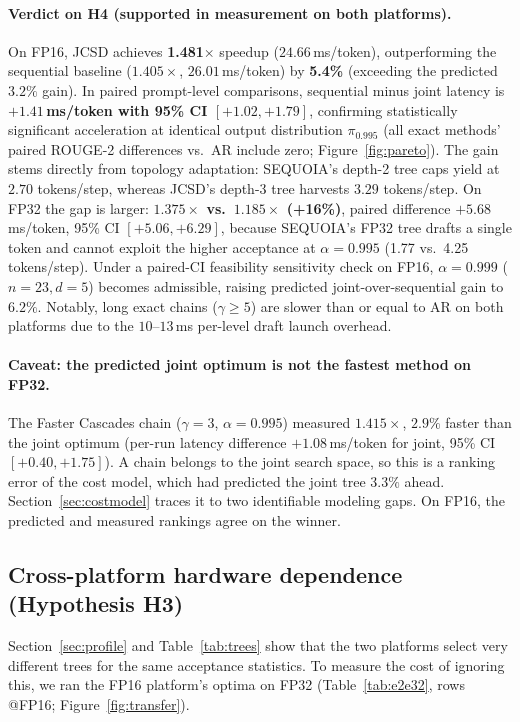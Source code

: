 \documentclass[10pt]{article}
\begin{document}
\paragraph{Verdict on H4 (supported in measurement on both platforms).} On FP16, JCSD achieves \textbf{1.481$\times$} speedup ($24.66$\,ms/token), outperforming the sequential baseline ($1.405\times$, $26.01$\,ms/token) by \textbf{5.4\%} (exceeding the predicted $3.2\%$ gain). In paired prompt-level comparisons, sequential minus joint latency is \textbf{$+1.41$\,ms/token with 95\% CI $[+1.02, +1.79]$}, confirming statistically significant acceleration at identical output distribution $\pi_{0.995}$ (all exact methods' paired ROUGE-2 differences vs.\ AR include zero; Figure~\ref{fig:pareto}). The gain stems directly from topology adaptation: SEQUOIA's depth-2 tree caps yield at $2.70$ tokens/step, whereas JCSD's depth-3 tree harvests $3.29$ tokens/step. On FP32 the gap is larger: \textbf{$1.375\times$ vs.\ $1.185\times$ (+16\%)}, paired difference $+5.68$\,ms/token, 95\% CI $[+5.06, +6.29]$, because SEQUOIA's FP32 tree drafts a single token and cannot exploit the higher acceptance at $\alpha = 0.995$ (1.77 vs.\ 4.25 tokens/step). Under a paired-CI feasibility sensitivity check on FP16, $\alpha = 0.999$ ($n=23, d=5$) becomes admissible, raising predicted joint-over-sequential gain to $6.2\%$. Notably, long exact chains ($\gamma \ge 5$) are slower than or equal to AR on both platforms due to the $10$--$13$\,ms per-level draft launch overhead.

\paragraph{Caveat: the predicted joint optimum is not the fastest method on FP32.} The Faster Cascades chain ($\gamma = 3$, $\alpha = 0.995$) measured $1.415\times$, $2.9\%$ faster than the joint optimum (per-run latency difference $+1.08$\,ms/token for joint, 95\% CI $[+0.40, +1.75]$). A chain belongs to the joint search space, so this is a ranking error of the cost model, which had predicted the joint tree $3.3\%$ ahead. Section~\ref{sec:costmodel} traces it to two identifiable modeling gaps. On FP16, the predicted and measured rankings agree on the winner.

\subsection{Cross-platform hardware dependence (Hypothesis H3)}
Section~\ref{sec:profile} and Table~\ref{tab:trees} show that the two platforms select very different trees for the same acceptance statistics. To measure the cost of ignoring this, we ran the FP16 platform's optima on FP32 (Table~\ref{tab:e2e32}, rows @FP16; Figure~\ref{fig:transfer}).
\end{document}
